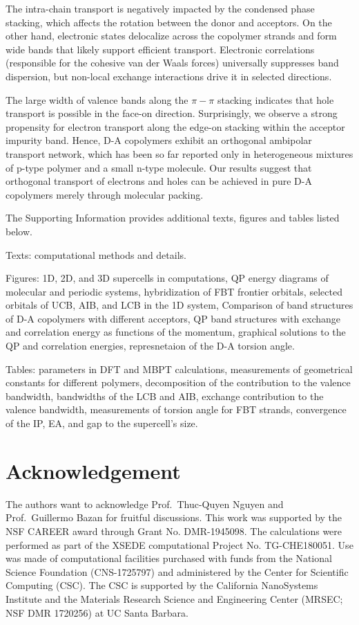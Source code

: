\documentclass[journal = jpclcd]{achemso}
\begin{document}
The intra-chain transport is negatively impacted by the condensed phase stacking, which affects the rotation between the donor and acceptors. On the other hand, electronic states delocalize across the copolymer strands and form wide bands that likely support efficient transport. Electronic correlations (responsible for the cohesive van der Waals forces) universally suppresses band dispersion, but non-local exchange interactions drive it in selected directions. 

The large width of valence bands along the $\pi-\pi$ stacking indicates that hole transport is possible in the face-on direction. Surprisingly, we observe a strong propensity for electron transport along the edge-on stacking within the acceptor impurity band. Hence, D-A copolymers exhibit an orthogonal ambipolar transport network, which has been so far reported only in heterogeneous mixtures of p-type polymer and a small n-type molecule.\cite{Huang2016,Huang2018} Our results suggest that orthogonal transport of electrons and holes can be achieved in pure D-A copolymers merely through molecular packing.

\begin{suppinfo}
The Supporting Information provides additional texts, figures and tables listed below.

Texts: computational methods and details.

Figures: 1D, 2D, and 3D supercells in computations, QP energy diagrams of molecular and periodic systems, hybridization of FBT frontier orbitals, selected orbitals of UCB, AIB, and LCB in the 1D system, Comparison of band structures of D-A copolymers with different acceptors, QP band structures with exchange and correlation energy as functions of the momentum, graphical solutions to the QP and correlation energies, represnetaion of the D-A torsion angle.

Tables: parameters in DFT and MBPT calculations, measurements of geometrical constants for different polymers, decomposition of the contribution to the valence bandwidth, bandwidths of the LCB and AIB, exchange contribution to the valence bandwidth, measurements of torsion angle for FBT strands, convergence of the IP, EA, and gap to the supercell's size.

\end{suppinfo}

\section{Acknowledgement}
The authors want to acknowledge Prof.~Thuc-Quyen Nguyen and Prof.~Guillermo Bazan for fruitful discussions. This work was supported by the NSF CAREER award through Grant No. DMR-1945098. The calculations were performed as part of the XSEDE computational Project No. TG-CHE180051. Use was made of computational facilities purchased with funds from the National Science Foundation (CNS-1725797) and administered by the Center for Scientific Computing (CSC). The CSC is supported by the California NanoSystems Institute and the Materials Research Science and Engineering Center (MRSEC; NSF DMR 1720256) at UC Santa Barbara.



\end{document}
